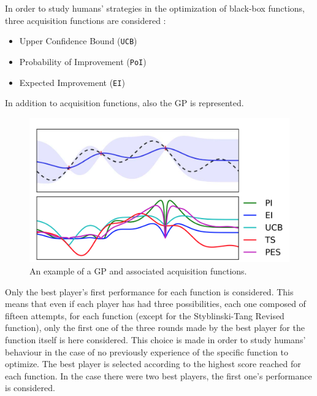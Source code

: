 In order to study humans' strategies in the optimization of black-box functions, three acquisition functions are considered :

\begin{itemize}
	\item Upper Confidence Bound ({\tt UCB}) \cite{DBLP:journals/pieee/ShahriariSWAF16}
	\item Probability of Improvement ({\tt PoI}) \cite{DBLP:journals/pieee/ShahriariSWAF16}
	\item Expected Improvement ({\tt EI}) \cite{DBLP:journals/pieee/ShahriariSWAF16}
\end{itemize}

In addition to acquisition functions, also the GP is represented. \\ 

\begin{figure} [h!]
	\centering
	\includegraphics[width=\linewidth]{IMAGES/Surrogate}
	\caption{An example of a GP and associated acquisition functions.}
	\label{fig:surrogate}
\end{figure}

Only the best player's first performance for each function is considered. This means that even if each player has had three possibilities, each one composed of fifteen attempts, for each function (except for the Styblinski-Tang Revised function), only the first one of the three rounds made by the best player for the function itself is here considered. This choice is made in order to study humans' behaviour in the case of no previously experience of the specific function to optimize. The best player is selected according to the highest score reached for each function. In the case there were two best players, the first one's performance is considered.  \\

